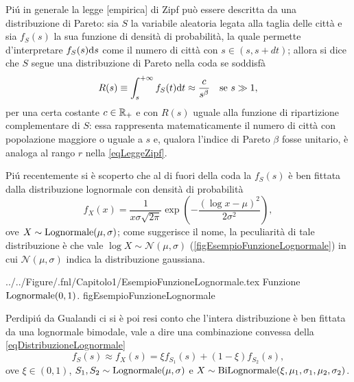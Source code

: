     Piú in generale la legge [empirica] di Zipf può essere descritta da una distribuzione di Pareto: sia \(S\) la variabile aleatoria legata alla taglia delle città e sia \(f_S(s)\) la sua funzione di densità di probabilità\footnotemark{}, la quale permette d'interpretare \(f_S(s)\mathrm{d} s\) come il numero di città con \(s\in(s,s+dt)\); allora si dice che \(S\) segue una distribuzione di Pareto nella coda se soddisfà%
    \begin{equation}
        \label{eqFunzioneRipartizioneComplementarePareto}
        R(s)\equiv\int_{s}^{+\infty}f_S(t)\mathrm{d} t\approx\frac c{s^\beta}
        \quad\text{se }s\gg1,
    \end{equation}
    per una certa costante \(c\in\mathbb R_+\) e con \(R(s)\) uguale alla funzione di ripartizione complementare di \(S\): essa rappresenta matematicamente il numero di città con popolazione maggiore o uguale a \(s\) e, qualora l'indice di Pareto \(\beta\) fosse unitario, è analoga al rango \(r\) nella \eqref{eqLeggeZipf}.

    Piú recentemente \cite{Eeckhout2004,Gualandi2019HBLD} si è scoperto che al di fuori della coda la \(f_S(s)\) è ben fittata dalla distribuzione lognormale con densità di probabilità
    \begin{equation}
        \label{eqDistribuzioneLognormale}
        f_X(x)=\frac1{x\sigma\sqrt{2\pi}}\exp\left( -\frac{(\log x-\mu)^2}{2\sigma^2}\right),
    \end{equation}
    ove \(X\sim\operatorname{Lognormale}(\mu,\sigma)\); come suggerisce il nome, la peculiarità di tale distribuzione è che vale \(\log X\sim\mathcal N(\mu,\sigma)\) (\cref{figEsempioFunzioneLognormale}) in cui \(\mathcal N(\mu,\sigma)\) indica la distribuzione gaussiana.

        {../../Figure/.fnl/Capitolo1/EsempioFunzioneLognormale.tex}
        {Funzione \(\operatorname{Lognormale}(0,1)\).}
        {\linewidth}{figEsempioFunzioneLognormale}

    Perdipiú da Gualandi \etal{} \cite{Gualandi2019HBLD,Gualandi2019SDC} ci si è poi resi conto che l'intera distribuzione è ben fittata da una lognormale bimodale, vale a dire una combinazione convessa della \eqref{eqDistribuzioneLognormale}
    \begin{equation}
        \label{eqDistribuzioneLognormaleBimodale}
        f_S(s)\approx f_X(s)=\xi f_{S_1}(s)+(1-\xi)f_{S_2}(s),
    \end{equation}
    ove \(\xi\in(0,1)\), \(S_1,S_2\sim\operatorname{Lognormale}(\mu,\sigma)\) e \(X\sim\operatorname{BiLognormale}(\xi,\mu_1,\sigma_1,\mu_2,\sigma_2)\).

